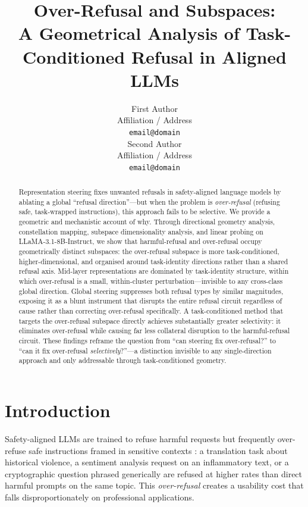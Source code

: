 \documentclass[11pt]{article}
\title{Over-Refusal and Subspaces:\\
A Geometrical Analysis of Task-Conditioned Refusal in Aligned LLMs}
\author{First Author \\
  Affiliation / Address \\
  \texttt{email@domain} \\\And
  Second Author \\
  Affiliation / Address \\
  \texttt{email@domain} \\}
\begin{document}
\maketitle

\begin{abstract}

Representation steering fixes unwanted refusals in safety-aligned language models by
ablating a global ``refusal direction''---but when the problem is \emph{over-refusal}
(refusing safe, task-wrapped instructions), this approach fails to be selective.
We provide a geometric and mechanistic account of why.
Through directional geometry analysis, constellation mapping, subspace dimensionality
analysis, and linear probing on LLaMA-3.1-8B-Instruct, we show that harmful-refusal
and over-refusal occupy geometrically distinct subspaces: the over-refusal subspace is
more task-conditioned, higher-dimensional, and organised around task-identity directions
rather than a shared refusal axis.
Mid-layer representations are dominated by task-identity structure, within which
over-refusal is a small, within-cluster perturbation---invisible to any cross-class
global direction.
Global steering suppresses both refusal types by similar magnitudes, exposing it
as a blunt instrument that disrupts the entire refusal circuit regardless of cause
rather than correcting over-refusal specifically.
A task-conditioned method that targets the over-refusal subspace directly achieves
substantially greater selectivity: it eliminates over-refusal while causing far less
collateral disruption to the harmful-refusal circuit.
These findings reframe the question from ``can steering fix over-refusal?''
to ``can it fix over-refusal \emph{selectively}?''---a distinction invisible to any
single-direction approach and only addressable through task-conditioned geometry.

\end{abstract}

\section{Introduction}

Safety-aligned LLMs are trained to refuse harmful requests but frequently over-refuse
safe instructions framed in sensitive contexts \citep{safeconstellations2025}: a
translation task about historical violence, a sentiment analysis request on an
inflammatory text, or a cryptographic question phrased generically are refused at higher
rates than direct harmful prompts on the same topic. This \emph{over-refusal} creates a
usability cost that falls disproportionately on professional applications.
\end{document}
